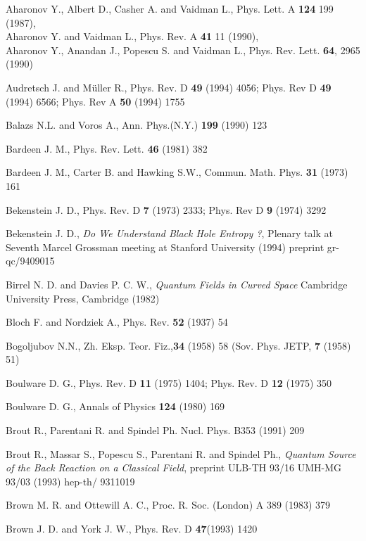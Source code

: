 \documentclass[12pt,oneside]{report}
\begin{document}
{\begin{thebibliography}{999}
 Aharonov Y., Albert D.,  Casher A. and Vaidman L., Phys. Lett.
A {\bf 124} 199 (1987),\\  
Aharonov Y. and Vaidman  L.,  Phys. Rev. A {\bf 41} 11 (1990),\\
Aharonov Y., Anandan  J.,  Popescu S. and Vaidman  L.,
     Phys. Rev. Lett. {\bf 64}, 2965 (1990)

Audretsch J. and M\"uller R., Phys. Rev. D {\bf 49} (1994)
 4056; Phys. Rev D {\bf 49} (1994) 6566; 
Phys. Rev A {\bf 50} (1994) 1755

Balazs N.L. and Voros A., Ann. Phys.(N.Y.) {\bf 199} (1990)
123

 Bardeen J. M., Phys. Rev. Lett. {\bf 46} (1981) 382

Bardeen J. M., Carter B. and Hawking S.W., Commun. Math. Phys. {\bf 31}
(1973) 161

 Bekenstein J. D., Phys. Rev. D {\bf7} (1973) 2333; Phys. Rev D {\bf
9} (1974) 3292 

 Bekenstein J. D.,  {\em Do We Understand Black Hole Entropy ?}, Plenary talk
at Seventh Marcel Grossman meeting at Stanford University
(1994) preprint gr-qc/9409015

Birrel N. D. and Davies P. C. W., {\em Quantum Fields in 
Curved Space} Cambridge University Press, Cambridge (1982)

Bloch F. and Nordziek A., Phys. Rev. {\bf 52} (1937) 54

Bogoljubov N.N., Zh. Eksp. Teor. Fiz.,{\bf  34} (1958) 58 (Sov. Phys.
JETP, {\bf 7 }(1958) 51)

Boulware D. G., Phys. Rev. D {\bf 11} (1975) 1404; Phys. Rev. D {\bf
12} (1975) 350

Boulware D. G., Annals of Physics {\bf 124} (1980) 169

 Brout R.,  Parentani R. and Spindel Ph. Nucl. Phys. B353 (1991) 209

Brout R., Massar S., Popescu S., Parentani R. and Spindel Ph., {\em
Quantum Source of the Back Reaction on a Classical Field}, preprint 
ULB-TH 93/16 UMH-MG
93/03 (1993) hep-th/ 9311019

Brown M. R. and Ottewill A. C., Proc. R. Soc. (London) A 389
(1983) 379

Brown J. D. and York J. W., Phys. Rev. D {\bf 47}(1993) 1420


\end{thebibliography}}
\end{document}

